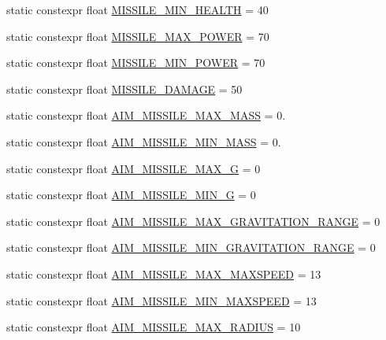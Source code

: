 \begin{DoxyCompactItemize}
\item 
static constexpr float \hyperlink{class_act_conf_a4c14bb097288d1509092e81ab5d048e0}{M\+I\+S\+S\+I\+L\+E\+\_\+\+M\+I\+N\+\_\+\+H\+E\+A\+L\+T\+H} = 40
\item 
static constexpr float \hyperlink{class_act_conf_a85495f7273ceb736d46b96ca77eed8e3}{M\+I\+S\+S\+I\+L\+E\+\_\+\+M\+A\+X\+\_\+\+P\+O\+W\+E\+R} = 70
\item 
static constexpr float \hyperlink{class_act_conf_afc166d491dfc39c8163f02aec00e5890}{M\+I\+S\+S\+I\+L\+E\+\_\+\+M\+I\+N\+\_\+\+P\+O\+W\+E\+R} = 70
\item 
static constexpr float \hyperlink{class_act_conf_a900ebd46115481058e6d19e330566889}{M\+I\+S\+S\+I\+L\+E\+\_\+\+D\+A\+M\+A\+G\+E} = 50
\item 
static constexpr float \hyperlink{class_act_conf_aa684b4626b1f4fcd220ed04d3c6ce0b0}{A\+I\+M\+\_\+\+M\+I\+S\+S\+I\+L\+E\+\_\+\+M\+A\+X\+\_\+\+M\+A\+S\+S} = 0.
\item 
static constexpr float \hyperlink{class_act_conf_ae896de277b11c901951c0353e5ad8a56}{A\+I\+M\+\_\+\+M\+I\+S\+S\+I\+L\+E\+\_\+\+M\+I\+N\+\_\+\+M\+A\+S\+S} = 0.
\item 
static constexpr float \hyperlink{class_act_conf_a5fc2b902e93d5fa994576d61c1da7d4b}{A\+I\+M\+\_\+\+M\+I\+S\+S\+I\+L\+E\+\_\+\+M\+A\+X\+\_\+\+G} = 0
\item 
static constexpr float \hyperlink{class_act_conf_a14cc53d07a2b882af1e85615a268ce9a}{A\+I\+M\+\_\+\+M\+I\+S\+S\+I\+L\+E\+\_\+\+M\+I\+N\+\_\+\+G} = 0
\item 
static constexpr float \hyperlink{class_act_conf_a7cfde462f70f9ccadfb3f8de92f3892e}{A\+I\+M\+\_\+\+M\+I\+S\+S\+I\+L\+E\+\_\+\+M\+A\+X\+\_\+\+G\+R\+A\+V\+I\+T\+A\+T\+I\+O\+N\+\_\+\+R\+A\+N\+G\+E} = 0
\item 
static constexpr float \hyperlink{class_act_conf_a756341ee3c9e00ebd3d24d186f2d3384}{A\+I\+M\+\_\+\+M\+I\+S\+S\+I\+L\+E\+\_\+\+M\+I\+N\+\_\+\+G\+R\+A\+V\+I\+T\+A\+T\+I\+O\+N\+\_\+\+R\+A\+N\+G\+E} = 0
\item 
static constexpr float \hyperlink{class_act_conf_a6a667ef2cb278b95249897e977438086}{A\+I\+M\+\_\+\+M\+I\+S\+S\+I\+L\+E\+\_\+\+M\+A\+X\+\_\+\+M\+A\+X\+S\+P\+E\+E\+D} = 13
\item 
static constexpr float \hyperlink{class_act_conf_aa2b499409c5c84f28210aabc2883ec77}{A\+I\+M\+\_\+\+M\+I\+S\+S\+I\+L\+E\+\_\+\+M\+I\+N\+\_\+\+M\+A\+X\+S\+P\+E\+E\+D} = 13
\item 
static constexpr float \hyperlink{class_act_conf_ad333fc03f69258202837acc5b58d9dfa}{A\+I\+M\+\_\+\+M\+I\+S\+S\+I\+L\+E\+\_\+\+M\+A\+X\+\_\+\+R\+A\+D\+I\+U\+S} = 10

\end{DoxyCompactItemize}
